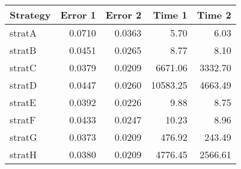 \begin{tabular}{|l|r|r|r|r|}
\hline
\textbf{Strategy} & \textbf{Error 1 } & \textbf{Error 2 } & \textbf{Time 1 } & \textbf{Time 2 } \\
\hline
stratA & 0.0710& 0.0363 &5.70& 6.03\\ \hline
stratB & 0.0451& 0.0265& 8.77& 8.10 \\ \hline
stratC &0.0379& 0.0209 &6671.06& 3332.70 \\ \hline
stratD & 0.0447& 0.0260& 10583.25& 4663.49 \\ \hline
stratE  &0.0392& 0.0226 & 9.88& 8.75 \\ \hline
stratF &0.0433& 0.0247& 10.23& 8.96  \\ \hline
stratG &0.0373& 0.0209 &476.92& 243.49  \\ \hline
stratH & 0.0380& 0.0209& 4776.45& 2566.61 \\ \hline
\end{tabular}
